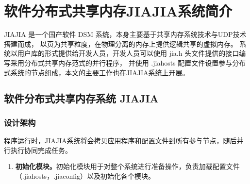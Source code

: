 \chapter{软件分布式共享内存JIAJIA系统简介}\label{chap:JIAJIA}{
    JIAJIA 是一个国产软件 DSM 系统，本身主要基于共享内存系统技术与UDP技术搭建而成，
    以页为共享粒度，在物理分离的内存上提供逻辑共享的虚拟内存。
    系统以用户库的形式提供给开发人员，开发人员可以使用 jia.h 头文件提供的接口编写采用分布式共享内存范式的并行程序，
    并使用 .jiahosts 配置文件设置参与分布式系统的节点组成，本文的主要工作也在JIAJIA系统上开展。

    \section{软件分布式共享内存系统 JIAJIA}
    \subsection{设计架构}

    程序运行时，JIAJIA系统将会拷贝应用程序和配置文件到所有参与节点，随后并行执行协同完成任务。

    \begin{enumerate}[label=\arabic*.]
        \item \textbf{初始化模块。}初始化模块用于对整个系统进行准备操作，负责加载配置文件（.jiahosts，.jiaconfig）以及初始化各个模块。


\end{enumerate}}
